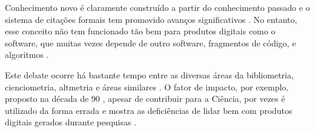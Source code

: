 Conhecimento novo é claramente construído a partir do conhecimento passado e o
sistema de citações formais tem promovido avanços significativos
\cite{katz2014transitive}.
No entanto, esse conceito não tem funcionado tão bem para produtos digitais
como o software, que muitas vezes depende de outro software, fragmentos de
código, e algoritmos \cite{katz2014transitive}.

Este debate ocorre há bastante tempo entre as diversas áreas da bibliometria,
cienciometria, altmetria e áreas similares \cite{gouveia2013altmetria}.
O fator de impacto, por exemplo, proposto na década de 90
\cite{reuters2017history}, apesar de contribuir para a Ciência, por
vezes é utilizado da forma errada e mostra as deficiências de lidar bem com
produtos digitais gerados durante pesquisas \cite{katz2014transitive}.






%

